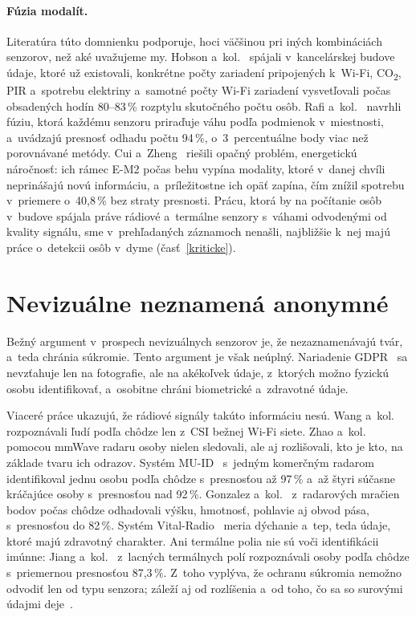 \documentclass[10pt,twoside,a4paper]{article}
\begin{document}
\paragraph{Fúzia modalít.} Literatúra túto domnienku podporuje, hoci väčšinou pri iných kombináciách senzorov, než aké uvažujeme my. Hobson a~kol.~\cite{hobson2019opportunistic} spájali v~kancelárskej budove údaje, ktoré už existovali, konkrétne počty zariadení pripojených k~Wi-Fi, CO\textsubscript{2}, PIR a~spotrebu elektriny a~samotné počty Wi-Fi zariadení vysvetľovali počas obsadených hodín 80--83\,\% rozptylu skutočného počtu osôb. Rafi a~kol.~\cite{rafi2024dwfl} navrhli fúziu, ktorá každému senzoru priraďuje váhu podľa podmienok v~miestnosti, a~uvádzajú presnosť odhadu počtu 94\,\%, o~3~percentuálne body viac než porovnávané metódy. Cui a~Zheng~\cite{cui2026em2} riešili opačný problém, energetickú náročnosť: ich rámec E-M2 počas behu vypína modality, ktoré v~danej chvíli neprinášajú novú informáciu, a~príležitostne ich opäť zapína, čím znížil spotrebu v~priemere o~40,8\,\% bez straty presnosti. Prácu, ktorá by na počítanie osôb v~budove spájala práve rádiové a~termálne senzory s~váhami odvodenými od kvality signálu, sme v~prehľadaných záznamoch nenašli, najbližšie k~nej majú práce o~detekcii osôb v~dyme (časť~\ref{kriticke}).

\section{Nevizuálne neznamená anonymné}\label{sukromie}

Bežný argument v~prospech nevizuálnych senzorov je, že nezaznamenávajú tvár, a~teda chránia súkromie. Tento argument je však neúplný. Nariadenie GDPR~\cite{gdpr2016} sa nevzťahuje len na fotografie, ale na akékoľvek údaje, z~ktorých možno fyzickú osobu identifikovať, a~osobitne chráni biometrické a~zdravotné údaje.

Viaceré práce ukazujú, že rádiové signály takúto informáciu nesú. Wang a~kol.~\cite{wang2016gait} rozpoznávali ľudí podľa chôdze len z~CSI bežnej Wi-Fi siete. Zhao a~kol.~\cite{zhao2019mid} pomocou mmWave radaru osoby nielen sledovali, ale aj rozlišovali, kto je kto, na základe tvaru ich odrazov. Systém MU-ID~\cite{yang2020muid} s~jedným komerčným radarom identifikoval jednu osobu podľa chôdze s~presnosťou až 97\,\% a~až štyri súčasne kráčajúce osoby s~presnosťou nad 92\,\%. Gonzalez a~kol.~\cite{gonzalez2025informer} z~radarových mračien bodov počas chôdze odhadovali výšku, hmotnosť, pohlavie aj obvod pása, s~presnosťou do 82\,\%. Systém Vital-Radio~\cite{adib2015vital} meria dýchanie a~tep, teda údaje, ktoré majú zdravotný charakter. Ani termálne polia nie sú voči identifikácii imúnne: Jiang a~kol.~\cite{jiang2026warmgait} z~lacných termálnych polí rozpoznávali osoby podľa chôdze s~priemernou presnosťou 87,3\,\%. Z~toho vyplýva, že ochranu súkromia nemožno odvodiť len od typu senzora; záleží aj od rozlíšenia a~od toho, čo sa so surovými údajmi deje~\cite{rintahomi2021howlow}.
\end{document}
